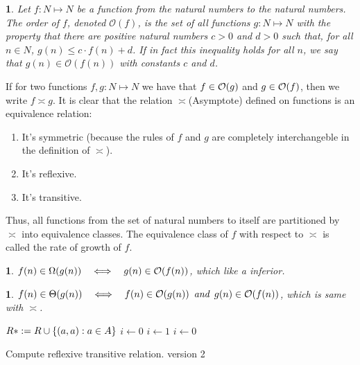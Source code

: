 \newtheorem{orderoffunc}[theorem_root]{}
\begin{orderoffunc}
Let $f: N\mapsto N$ be a function from the natural numbers to the natural numbers.
The order of $f$, denoted $\mathcal{O}(f)$, is the set of all functions $g: N\mapsto N$ with
the property that there are positive natural numbers $c>0$ and $d>0$ such that, for all
$n\in N$, $g(n)\le c\cdot f(n) + d$. If in fact this inequality holds for all $n$, 
we say that $g(n) \in \mathcal{O}(f(n))$ with constants $c$ and $d$.
\end{orderoffunc}

If for two functions $f,g: N\mapsto N$ we have that $f\in\bigo(g)$ and $g\in\bigo(f)$,
then we write $f\asymp g$. It is clear that the relation $\asymp$(Asymptote) defined on 
functions is an equivalence relation:
\begin{enumerate}
    \item It's symmetric (because the rules of $f$ and $g$ are completely interchangeble in 
    the definition of $\asymp$).
    \item It's reflexive.
    \item It's transitive.
\end{enumerate}

Thus, all functions from the set of natural numbers to itself are partitioned by $\asymp$ into 
equivalence classes. The equivalence class of $f$ with respect to $\asymp$ is called 
the rate of growth of $f$.

\newtheorem{inferior-of-func}[theorem_root]{}
\begin{inferior-of-func}
$f(n)\in\Omega(g(n))\quad\Longleftrightarrow\quad g(n)\in\bigo(f(n))$, which like a inferior.
\end{inferior-of-func}
\newtheorem{same-growth-of-func}[theorem_root]{}
\begin{same-growth-of-func}
$f(n)\in\Theta(g(n))\quad\Longleftrightarrow\quad f(n)\in\bigo(g(n)) \aand g(n)\in\bigo(f(n))$, which is same with $\asymp$.
\end{same-growth-of-func}

\begin{algorithm}
\begin{algorithmic}[1]
\Init
\State $R\ast := R\cup \{(a, a): a\in A\}$
\State $i\gets 0$  
\EndInit
{}
\State $i\gets 1$
\State{}
\State $i\gets 0$
\EndIf
\EndFor
\EndWhile
\end{algorithmic}
\caption{Compute reflexive transitive relation. version 2}
\label{alg:reflexive_transitive_closure_of_relation_vt}
\end{algorithm}

